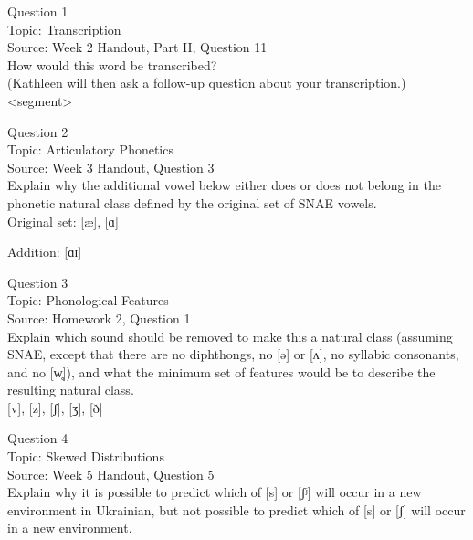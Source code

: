 \documentclass[12pt]{article}
\begin{document}
{\large Question 1}\\

Topic: Transcription\\
Source: Week 2 Handout, Part II, Question 11\\

How would this word be transcribed?\\ (Kathleen will then ask a follow-up question about your transcription.)\\

<segment>


\newpage

{\large Question 2}\\

Topic: Articulatory Phonetics\\
Source: Week 3 Handout, Question 3\\

Explain why the additional vowel below either does or does not belong in the phonetic natural class defined by the original set of SNAE vowels.\\

Original set: {[æ]}, {[ɑ]}

Addition: {[ɑɪ]}


\newpage

{\large Question 3}\\

Topic: Phonological Features\\
Source: Homework 2, Question 1\\

Explain which sound should be removed to make this a natural class (assuming SNAE, except that there are no diphthongs, no [ə] or [ʌ], no syllabic consonants, and no [w̥]), and what the minimum set of features would be to describe the resulting natural class.\\

{[v]}, {[z]}, {[ʃ]}, {[ʒ]}, {[ð]}


\newpage

{\large Question 4}\\

Topic: Skewed Distributions\\
Source: Week 5 Handout, Question 5\\

Explain why it is possible to predict which of [s] or [ʃʲ] will occur in a new environment in Ukrainian, but not possible to predict which of [s] or [ʃ] will occur in a new environment.\\
\end{document}

